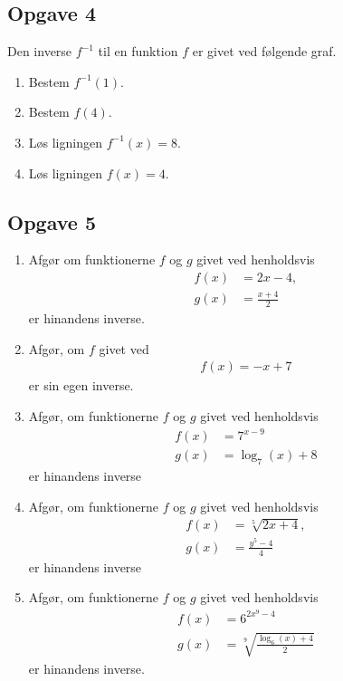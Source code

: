 \subsection*{Opgave 4}
Den inverse $f^{-1}$ til en funktion $f$ er givet ved følgende graf. 
\begin{center}
\end{center}
\begin{enumerate}[label=\roman*)]
	\item Bestem $f^{-1}(1)$.
	\item Bestem $f(4)$.
	\item Løs ligningen $f^{-1}(x) = 8$.
	\item Løs ligningen $f(x) = 4$.
\end{enumerate}

\subsection*{Opgave 5}
\begin{enumerate}[label=\roman*)]
	\item Afgør om funktionerne $f$ og $g$ givet ved henholdsvis 
	\begin{align*}
		f(x) &= 2x - 4, \\
		g(x) &= \frac{x+4}{2}
	\end{align*}
	er hinandens inverse. 
	\item Afgør, om $f$ givet ved
	\begin{align*}
		f(x) = -x + 7
	\end{align*}
	er sin egen inverse.
	\item Afgør, om funktionerne $f$ og $g$ givet ved henholdsvis
	\begin{align*}
		f(x) &= 7^{x-9}\\
		g(x) &= \log_7(x)+8
	\end{align*}
	er hinandens inverse
	\item Afgør, om funktionerne $f$ og $g$ givet ved henholdsvis
	\begin{align*}
		f(x) &= \sqrt[5]{2x+4},\\
		g(x) &= \frac{y^5-4}{4}
	\end{align*}
	er hinandens inverse
	\item Afgør, om funktionerne $f$ og $g$ givet ved henholdsvis
	\begin{align*}
		f(x) &= 6^{2x^9 - 4} \\
		g(x) &= \sqrt[9]{\frac{\log_6(x) + 4}{2}}
	\end{align*}
	er hinandens inverse.
	
\end{enumerate}

